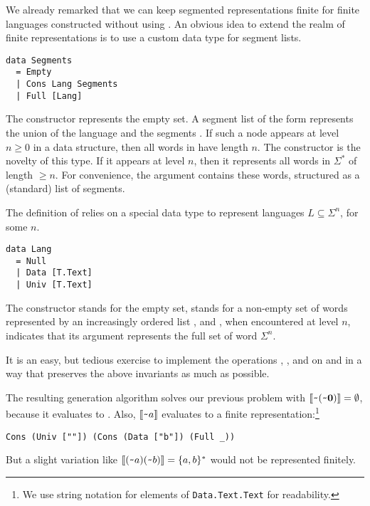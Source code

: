 We already remarked that we can keep segmented representations finite
for finite languages constructed without using . An
obvious idea to extend the realm of finite representations is to use a
custom data type  for segment lists.
\begin{lstlisting}
data Segments
  = Empty
  | Cons Lang Segments
  | Full [Lang]
\end{lstlisting}
The constructor  represents the empty set. A segment list
of the form  represents the union of the language
 and the segments . If such a  node
appears at level $n\ge0$ in a  data structure, then all
words in  have length $n$. The constructor  is
the novelty of this type. If it appears at level $n$, then it
represents all words in $\Sigma^*$ of length $\ge n$. For convenience,
the argument  contains these words, structured as a
(standard) list of segments.

The definition of  relies on a special data type  to
represent languages $L\subseteq \Sigma^n$,  for some $n$.
\begin{lstlisting}
data Lang
  = Null
  | Data [T.Text]
  | Univ [T.Text]
\end{lstlisting}
The constructor  stands for the empty set, 
stands for a non-empty set of words represented by an increasingly
ordered list , and , when encountered at level
$n$, indicates that its argument  represents the full set of
word $\Sigma^n$.

It is an easy, but tedious exercise to implement the operations
, , and  on 
and  in a way that preserves the above invariants as
much as possible.

The resulting generation algorithm solves our previous problem 
with $\llbracket\texttt{\textasciitilde}{(\texttt{\textasciitilde}{\mathbf0})}\rrbracket = \emptyset$,
because it evaluates to . Also, $\llbracket\texttt{\textasciitilde}{a}\rrbracket$
evaluates to a finite representation:\footnote{We use string notation
  for elements of \lstinline{Data.Text.Text} for readability.}
\begin{lstlisting}[numbers=none]
Cons (Univ [""]) (Cons (Data ["b"]) (Full _))
\end{lstlisting}
But a slight variation like
$\llbracket(\texttt{\textasciitilde}{a})(\texttt{\textasciitilde}{b})\rrbracket = \{a,b\}^*$ would not be
represented finitely.

